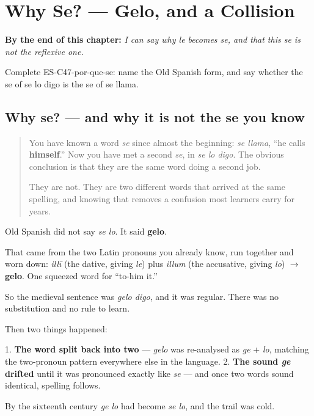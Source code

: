 
\chapter{Why Se? --- Gelo, and a Collision}
\label{ch:etymon-gelo}

\begin{chapteropening}
\textbf{By the end of this chapter:} \emph{I can say why le becomes se, and that this se is not the reflexive one.}

Complete ES-C47-por-que-se: name the Old Spanish form, and say whether the se of se lo digo is the se of se llama.
\end{chapteropening}

\section[gelo to se lo]{Why se? — and why it is not the se you know}

\label{lesson:ES-C47-por-que-se}



\begin{quote}
You have known a word \emph{se} since almost the beginning: \emph{se llama}, \textquotedblleft{}he calls \textbf{himself}.\textquotedblright{} Now you have met a second \emph{se}, in \emph{se lo digo}. The obvious conclusion is that they are the same word doing a second job.

They are not. They are two different words that arrived at the same spelling, and knowing that removes a confusion most learners carry for years.
\end{quote}

\begin{cousinweb}
Old Spanish did not say \emph{se lo}. It said \textbf{gelo}.

That came from the two Latin pronouns you already know, run together and worn down: \emph{illī} (the dative, giving \emph{le}) plus \emph{illum} (the accusative, giving \emph{lo}) $\to$ \textbf{gelo}. One squeezed word for \textquotedblleft{}to-him it.\textquotedblright{}

So the medieval sentence was \emph{gelo digo}, and it was regular. There was no substitution and no rule to learn.

Then two things happened:

1. \textbf{The word split back into two} — \emph{gelo} was re-analysed as \emph{ge} + \emph{lo}, matching the two-pronoun pattern everywhere else in the language. 2. \textbf{The sound \emph{ge} drifted} until it was pronounced exactly like \emph{se} — and once two words sound identical, spelling follows.

By the sixteenth century \emph{ge lo} had become \emph{se lo}, and the trail was cold.
\end{cousinweb}

